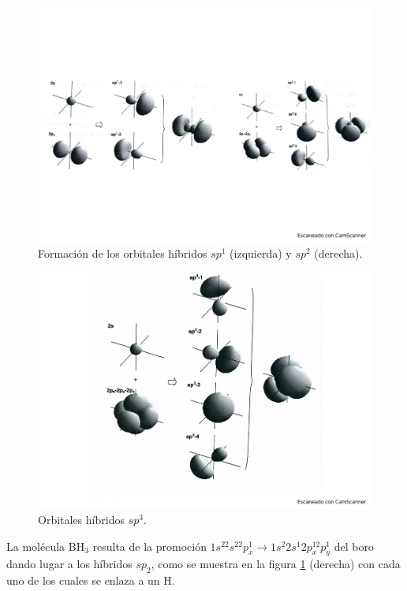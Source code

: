 \begin{figure}[h!] \centering
    \includegraphics[scale=0.5]{Cuerpo/Ch_03/Fotos libro 6.pdf}
    \caption{Formación de los orbitales híbridos $sp^1$ (izquierda) y $sp^2$ (derecha).}
    \label{Fig:03-07}
\end{figure}    

\begin{figure}[h!] \centering
    \includegraphics[scale=0.5]{Cuerpo/Ch_03/Fotos libro 7.pdf}
    \caption{Orbitales híbridos $sp^3$.}
    \label{Fig:03-08}
\end{figure}    


La molécula BH$_3$ resulta de la promoción $1s^22s^22p_x^1\rightarrow 1s^2 2s^1 2p_x^12p_y^1$ del boro dando lugar a los híbridos $sp_2$, como se muestra en la figura \ref{Fig:03-07} (derecha) con cada uno de los cuales se enlaza a un H. 

